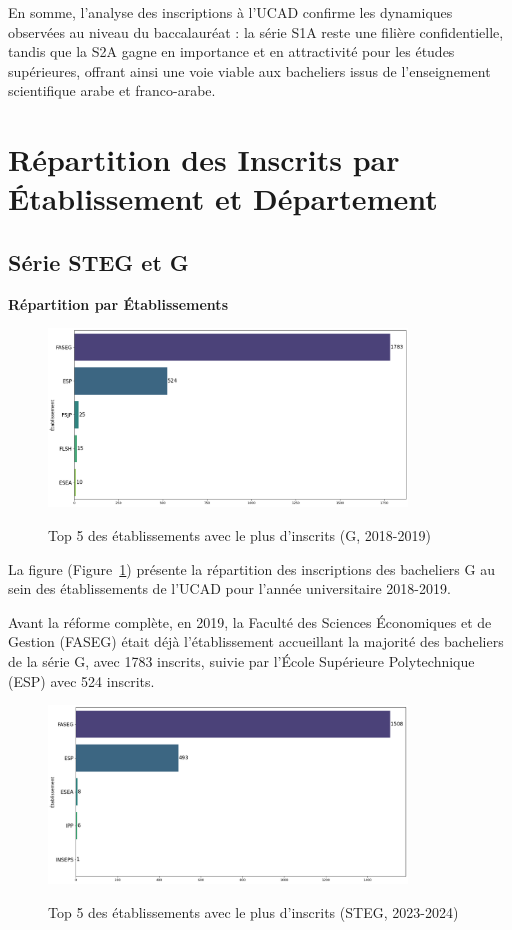 En somme, l'analyse des inscriptions à l'UCAD confirme les dynamiques observées au niveau du baccalauréat : la série S1A reste une filière confidentielle, tandis que la S2A gagne en importance et en attractivité pour les études supérieures, offrant ainsi une voie viable aux bacheliers issus de l'enseignement scientifique arabe et franco-arabe.

\newpage
\section{Répartition des Inscrits par Établissement et Département}

\subsection{Série STEG et G}

\textbf{Répartition par Établissements}

\begin{figure}[ht]
\centering
\caption{Top 5 des établissements avec le plus d'inscrits (G, 2018-2019)}
\includegraphics[width=0.85\textwidth]{figure/etab_G_2019.png}
\label{fig:etab_g_2019}
\end{figure}

La figure (Figure~\ref{fig:etab_g_2019}) présente la répartition des inscriptions des bacheliers G au sein des établissements de l'UCAD pour l'année universitaire 2018-2019.

Avant la réforme complète, en 2019, la Faculté des Sciences Économiques et de Gestion (FASEG) était déjà l'établissement accueillant la majorité des bacheliers de la série G, avec 1783 inscrits, suivie par l'École Supérieure Polytechnique (ESP) avec 524 inscrits. 

\begin{figure}[ht]
\centering
\caption{Top 5 des établissements avec le plus d'inscrits (STEG, 2023-2024)}
\includegraphics[width=0.85\textwidth]{figure/etab_STEG_2024.png}
\label{fig:etab_steg_2024}
\end{figure}

